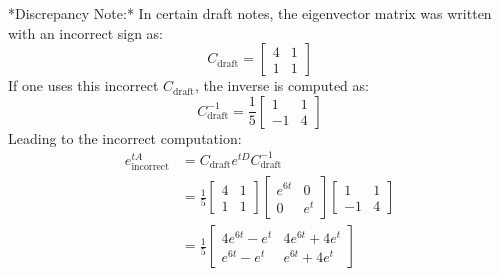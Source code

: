 \documentclass[12pt,a4paper]{report}
\theoremstyle{definition}
\numberwithin{equation}{chapter}
\begin{document}
*Discrepancy Note:* In certain draft notes, the eigenvector matrix was written with an incorrect sign as:
\begin{equation}
C_{\text{draft}} = \begin{bmatrix} 4 & 1 \\ 1 & 1 \end{bmatrix}
\end{equation}
If one uses this incorrect $C_{\text{draft}}$, the inverse is computed as:
\begin{equation}
C_{\text{draft}}^{-1} = \frac{1}{5}\begin{bmatrix} 1 & 1 \\ -1 & 4 \end{bmatrix}
\end{equation}
Leading to the incorrect computation:
\begin{equation}
\begin{aligned}
e^{tA}_{\text{incorrect}} &= C_{\text{draft}} e^{tD} C_{\text{draft}}^{-1} \\
&= \frac{1}{5} \begin{bmatrix} 4 & 1 \\ 1 & 1 \end{bmatrix} \begin{bmatrix} e^{6t} & 0 \\ 0 & e^t \end{bmatrix} \begin{bmatrix} 1 & 1 \\ -1 & 4 \end{bmatrix} \\
&= \frac{1}{5} \begin{bmatrix} 4e^{6t} - e^t & 4e^{6t} + 4e^t \\ e^{6t} - e^t & e^{6t} + 4e^t \end{bmatrix}
\end{aligned}
\end{equation}
\end{document}
